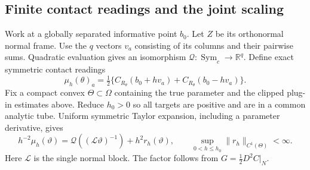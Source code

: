 \documentclass[11pt,reqno]{amsart}
\numberwithin{equation}{section}
\theoremstyle{definition}\newtheorem{definition}[theorem]{Definition}
\theoremstyle{remark}\newtheorem{remark}[theorem]{Remark}
\newcommand{\R}{\mathbb R}
\newcommand{\Sym}{\operatorname{Sym}}
\newcommand{\LL}{\mathcal L}
\begin{document}
\subsection{Finite contact readings and the joint scaling}
Work at a globally separated informative point $b_0$. Let $Z$ be its orthonormal normal frame. Use the $q$ vectors $v_a$ consisting of its columns and their pairwise sums. Quadratic evaluation gives an isomorphism $\mathcal Q:\Sym_c\to\R^q$. Define exact symmetric contact readings
\[
 \mu_h(\theta)_a=\tfrac12\{C_{R_\theta}(b_0+hv_a)+C_{R_\theta}(b_0-hv_a)\}.
\]
Fix a compact convex $\Theta\subset\Omega$ containing the true parameter and the clipped plug-in estimates above. Reduce $h_0>0$ so all targets are positive and are in a common analytic tube. Uniform symmetric Taylor expansion, including a parameter derivative, gives
\begin{equation}\label{eq:offset}
 h^{-2}\mu_h(\vartheta)=\mathcal Q((\LL\vartheta)^{-1})+h^2r_h(\vartheta),
 \qquad \sup_{0<h\le h_0}\|r_h\|_{C^1(\Theta)}<\infty.
\end{equation}
Here $\LL$ is the single normal block. The factor follows from $G=\tfrac12D^2C|_N$.
\end{document}

